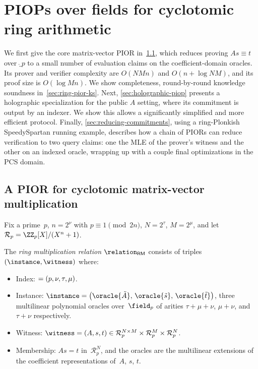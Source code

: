 \section{PIOPs over fields for cyclotomic ring arithmetic}
\label{sec:ring-piop}

We first give the core matrix-vector PIOR in~\cref{sec:matrix-vector-pior}, which reduces proving $As \equiv t$ over $\ring_p$ to a small number of evaluation claims on the coefficient-domain oracles. Its prover and verifier complexity are $O(NMn)$ and $O(n + \log NM)$, and its proof size is $O(\log Mn)$. We show completeness, round-by-round knowledge soundness in~\cref{sec:ring-pior-ks}. Next, \cref{sec:holographic-piop} presents a holographic specialization for the public $A$ setting, where its commitment is output by an indexer. We show this allows a significantly simplified and more efficient protocol. Finally, \cref{sec:reducing-commitments}, using a ring-Plonkish SpeedySpartan running example, describes how a chain of PIORs can reduce verification to two query claims: one the MLE of the prover's witness and the other on an indexed oracle, wrapping up with a couple final optimizations in the PCS domain.

\subsection{A PIOR for cyclotomic matrix-vector multiplication}
\label{sec:matrix-vector-pior}

Fix a prime~$p$, $n = 2^\nu$ with $p \equiv 1 \pmod{2n}$, $N = 2^\tau$, $M = 2^\mu$, and let $\mathcal{R}_p = \ZZ_p[X]/(X^n+1)$.

\begin{definition}
\label{def:source-rel}
The \emph{ring multiplication relation} $\relation_{\mathsf{RM}}$ consists of triples $(\index, \instance, \witness)$ where:
\begin{itemize}[nosep]
  \item Index: $\index = (p, \nu, \tau, \mu)$.
  \item Instance: $\instance = \bigl(\oracle{\tilde{A}},\, \oracle{\tilde{s}},\, \oracle{\tilde{t}}\bigr)$, three multilinear polynomial oracles over~$\field_p$ of arities $\tau{+}\mu{+}\nu$, $\mu{+}\nu$, and $\tau{+}\nu$ respectively.
  \item Witness: $\witness = (A,s,t) \in \mathcal{R}_p^{N \times M} \times \mathcal{R}_p^M \times \mathcal{R}_p^N$.
  \item Membership: $As = t$ in~$\mathcal{R}_p^N$, and the oracles are the multilinear extensions of the coefficient representations of~$A$, $s$, $t$.
\end{itemize}
\end{definition}


